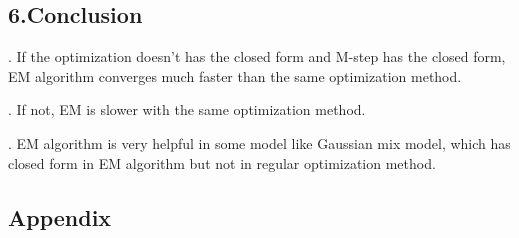 \documentclass{article}
\begin{document}
\subsection*{6.Conclusion}

. If the optimization doesn't has the closed form and M-step has the closed form, EM algorithm converges much faster than the same optimization method.

. If not, EM is slower with the same optimization method.

. EM algorithm is very helpful in some model like Gaussian mix model, which has closed form in EM algorithm but not in regular optimization method.

\subsection*{Appendix}
\end{document}
